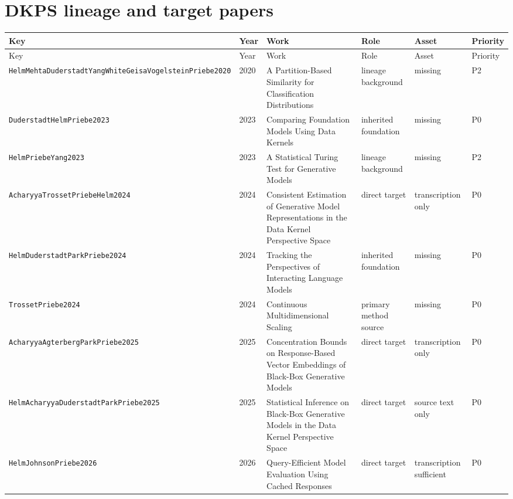 \documentclass[10pt]{article}
\newcommand{\code}[1]{\texttt{#1}}
\begin{document}
\section*{DKPS lineage and target papers}
\begin{longtable}{@{}p{}p{}p{}p{}p{}p{}@{}}
\toprule
Key & Year & Work & Role & Asset & Priority \\
\midrule
\endfirsthead
\toprule
Key & Year & Work & Role & Asset & Priority \\
\midrule
\endhead
\code{HelmMehtaDuderstadtYangWhiteGeisaVogelsteinPriebe2020} & 2020 & A Partition-Based Similarity for Classification Distributions & lineage background & missing & P2 \\
\code{DuderstadtHelmPriebe2023} & 2023 & Comparing Foundation Models Using Data Kernels & inherited foundation & missing & P0 \\
\code{HelmPriebeYang2023} & 2023 & A Statistical Turing Test for Generative Models & lineage background & missing & P2 \\
\code{AcharyyaTrossetPriebeHelm2024} & 2024 & Consistent Estimation of Generative Model Representations in the Data Kernel Perspective Space & direct target & transcription only & P0 \\
\code{HelmDuderstadtParkPriebe2024} & 2024 & Tracking the Perspectives of Interacting Language Models & inherited foundation & missing & P0 \\
\code{TrossetPriebe2024} & 2024 & Continuous Multidimensional Scaling & primary method source & missing & P0 \\
\code{AcharyyaAgterbergParkPriebe2025} & 2025 & Concentration Bounds on Response-Based Vector Embeddings of Black-Box Generative Models & direct target & transcription only & P0 \\
\code{HelmAcharyyaDuderstadtParkPriebe2025} & 2025 & Statistical Inference on Black-Box Generative Models in the Data Kernel Perspective Space & direct target & source text only & P0 \\
\code{HelmJohnsonPriebe2026} & 2026 & Query-Efficient Model Evaluation Using Cached Responses & direct target & transcription sufficient & P0 \\
\bottomrule
\end{longtable}
\end{document}
